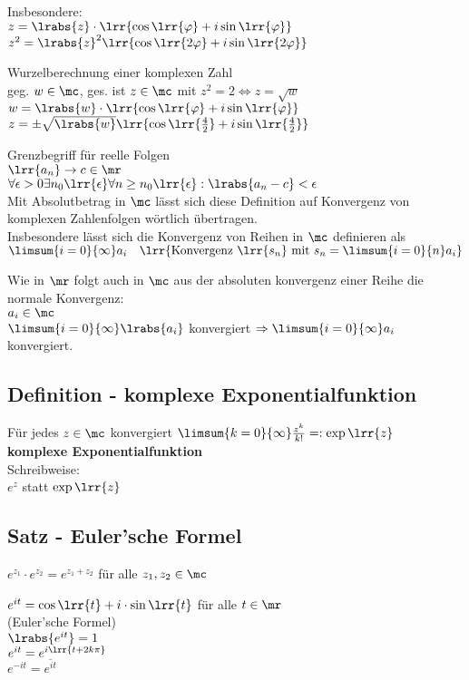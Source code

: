 			Insbesondere:\\
			$z=\lrabs{z}\cdot\lrr{\cos\lrr{\varphi}+i\sin\lrr{\varphi}}$\\
			$z^2=\lrabs{z}^2\lrr{\cos\lrr{2\varphi}+i\sin\lrr{2\varphi}}$
		\item Wurzelberechnung einer komplexen Zahl\\
			geg. $w\in\mc$, ges. ist $z\in\mc$ mit $z^2=2\Leftrightarrow z=\sqrt{w}$\\
			$w=\lrabs{w}\cdot\lrr{\cos\lrr{\varphi}+i\sin\lrr{\varphi}}$\\
			$z=\pm\sqrt{\lrabs{w}}\lrr{\cos\lrr{\frac{4}{2}}+i\sin\lrr{\frac{4}{2}}}$
			
			Grenzbegriff für reelle Folgen\\
			$\lrr{a_n}\rightarrow c\in\mr$\\
			$\forall\epsilon >0\exists n_0\lrr{\epsilon}\forall n\geq n_0\lrr{\epsilon}:\lrabs{a_n-c}<\epsilon$\\
			Mit Absolutbetrag in $\mc$ lässt sich diese Definition auf Konvergenz von komplexen Zahlenfolgen wörtlich übertragen.\\
			Insbesondere lässt sich die Konvergenz von Reihen in $\mc$ definieren als\\
			$\limsum{i=0}{\infty}a_i\quad\lrr{\mbox{Konvergenz } \lrr{s_n} \mbox{ mit } s_n=\limsum{i=0}{n}a_i}$
			
			Wie in $\mr$ folgt auch in $\mc$ aus der absoluten konvergenz einer Reihe die normale Konvergenz:\\
			$a_i\in\mc$\\
			$\limsum{i=0}{\infty}\lrabs{a_i}$ konvergiert $\Rightarrow \limsum{i=0}{\infty}a_i$ konvergiert.
	\subExEnd

\subsection{Definition - komplexe Exponentialfunktion}
	Für jedes $z\in\mc$ konvergiert $\limsum{k=0}{\infty}\frac{z^k}{k!}=:\exp\lrr{z}$\\
	\textbf{komplexe Exponentialfunktion}\\
	Schreibweise:\\
	$e^z$ statt $\exp\lrr{z}$

\subsection{Satz - Euler'sche Formel}
		\item $e^{z_1}\cdot e^{z_2}=e^{z_1+z_2}$ für alle $z_1,z_2\in\mc$
		\item $e^{it}=\cos\lrr{t}+i\cdot\sin\lrr{t}$ für alle $t\in\mr$\\
			(Euler'sche Formel)\\
			$\lrabs{e^{it}}=1$\\
			$e^{it}=e^{i\lrr{t+2k\pi}}$\\
			$e^{-it}=\overline{e^{it}}$
			
